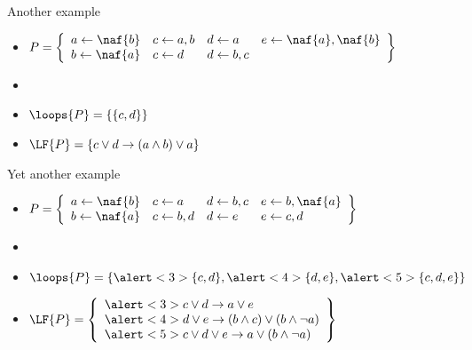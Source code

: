 \begin{frame}[c]{Another example}
  \bigskip
  \begin{itemize}
  \item<1->
  \(
  P
  =
  \left\{
    \begin{array}{llll}
        a \leftarrow \naf{b}
      & c \leftarrow a,b
      & d \leftarrow a
      & e \leftarrow\naf{a},\naf{b}
      \\
        b \leftarrow \naf{a}
      & c \leftarrow d
      & d \leftarrow b,c
      &
    \end{array}
  \right\}
  \)
  \bigskip
  \item<1-> []
    \begin{center}
    
    \end{center}
  \item<1-> $\loops{P}=\{\{c,d\}\}$
  \item<2-> $\LF{P}=\{c\vee d\rightarrow (a\wedge b)\vee a\}$
\end{itemize}
\end{frame}
\begin{frame}[c]{Yet another example}
  \bigskip
  \begin{itemize}
  \item<1->
  \(
  P
  =
  \left\{
    \begin{array}{llll}
        a\leftarrow \naf{b}
      & c\leftarrow a
      & d\leftarrow b,c
      & e\leftarrow b,\naf{a}
      \\
        b\leftarrow \naf{a}
      & c\leftarrow b,d
      & d\leftarrow e
      & e\leftarrow c,d
    \end{array}
  \right\}
  \)
  \bigskip
  \item<1-> []
    \begin{center}
    
    \end{center}
  \item<1-> $\loops{P}=\{\alert<3>{\{c,d\}},\alert<4>{\{d,e\}},\alert<5>{\{c,d,e\}}\}$
    \smallskip
  \item<2->
    \(
    \LF{P}
    =
    \left\{
      \begin{array}[c]{l}
        \alert<3>{c\vee d\rightarrow a\vee e}\\
        \alert<4>{d\vee e\rightarrow (b\wedge c)\vee (b\wedge\neg a)}\\
        \alert<5>{c\vee d\vee e\rightarrow a \vee (b\wedge\neg a)}
      \end{array}
    \right\}
    \)
\end{itemize}
\end{frame}
